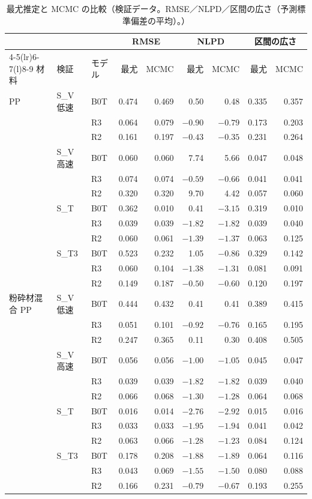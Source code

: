 \documentclass[paper=a4paper,fontsize=10.5pt,line_length=44zw,number_of_lines=38]{jlreq}
\newcommand{\file}[1]{\texttt{\detokenize{#1}}}
\begin{document}
\begin{table}[H]
\caption{最尤推定と MCMC の比較（検証データ。RMSE／NLPD／区間の広さ（予測標準偏差の平均）。\file{mle\_vs\_mcmc.csv}）}\label{tab:cmp}
\begin{tabularx}{\linewidth}{@{}l>{\raggedright\arraybackslash}p{5\zw}l*{6}{r}@{}}
\toprule
 & & & \multicolumn{2}{c}{RMSE} & \multicolumn{2}{c}{NLPD} & \multicolumn{2}{c}{区間の広さ} \\
\cmidrule(lr){4-5}\cmidrule(lr){6-7}\cmidrule(l){8-9}
材料 & 検証 & モデル & 最尤 & MCMC & 最尤 & MCMC & 最尤 & MCMC \\
\midrule
PP & S\_V 低速 & B0T & 0.474 & 0.469 & 0.50 & 0.48 & 0.335 & 0.357 \\
 &  & R3 & 0.064 & 0.079 & $-0.90$ & $-0.79$ & 0.173 & 0.203 \\
 &  & R2 & 0.161 & 0.197 & $-0.43$ & $-0.35$ & 0.231 & 0.264 \\
 & S\_V 高速 & B0T & 0.060 & 0.060 & 7.74 & 5.66 & 0.047 & 0.048 \\
 &  & R3 & 0.074 & 0.074 & $-0.59$ & $-0.66$ & 0.041 & 0.041 \\
 &  & R2 & 0.320 & 0.320 & 9.70 & 4.42 & 0.057 & 0.060 \\
 & S\_T & B0T & 0.362 & 0.010 & 0.41 & $-3.15$ & 0.319 & 0.010 \\
 &  & R3 & 0.039 & 0.039 & $-1.82$ & $-1.82$ & 0.039 & 0.040 \\
 &  & R2 & 0.060 & 0.061 & $-1.39$ & $-1.37$ & 0.063 & 0.125 \\
 & S\_T3 & B0T & 0.523 & 0.232 & 1.05 & $-0.86$ & 0.329 & 0.142 \\
 &  & R3 & 0.060 & 0.104 & $-1.38$ & $-1.31$ & 0.081 & 0.091 \\
 &  & R2 & 0.149 & 0.187 & $-0.50$ & $-0.60$ & 0.120 & 0.197 \\
粉砕材混合 PP & S\_V 低速 & B0T & 0.444 & 0.432 & 0.41 & 0.41 & 0.389 & 0.415 \\
 &  & R3 & 0.051 & 0.101 & $-0.92$ & $-0.76$ & 0.165 & 0.195 \\
 &  & R2 & 0.247 & 0.365 & 0.11 & 0.30 & 0.408 & 0.505 \\
 & S\_V 高速 & B0T & 0.056 & 0.056 & $-1.00$ & $-1.05$ & 0.045 & 0.047 \\
 &  & R3 & 0.039 & 0.039 & $-1.82$ & $-1.82$ & 0.039 & 0.040 \\
 &  & R2 & 0.066 & 0.068 & $-1.30$ & $-1.28$ & 0.064 & 0.068 \\
 & S\_T & B0T & 0.016 & 0.014 & $-2.76$ & $-2.92$ & 0.015 & 0.016 \\
 &  & R3 & 0.033 & 0.033 & $-1.95$ & $-1.94$ & 0.041 & 0.042 \\
 &  & R2 & 0.063 & 0.066 & $-1.28$ & $-1.23$ & 0.084 & 0.124 \\
 & S\_T3 & B0T & 0.178 & 0.208 & $-1.88$ & $-1.89$ & 0.064 & 0.116 \\
 &  & R3 & 0.043 & 0.069 & $-1.55$ & $-1.50$ & 0.080 & 0.088 \\
 &  & R2 & 0.166 & 0.231 & $-0.79$ & $-0.67$ & 0.193 & 0.255 \\
\bottomrule
\end{tabularx}
\end{table}
\end{document}
